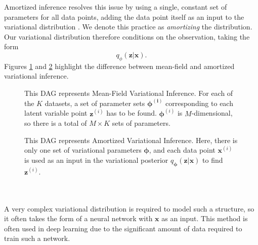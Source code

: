 \documentclass[honours,12pt]{unswthesis}
\numberwithin{equation}{section}
\theoremstyle{definition}
\begin{document}
Amortized inference resolves this issue by using a single, constant set of parameters for all data points, adding the data point itself as an input to the variational distribution \citep{ADVVI}. We denote this practice as \textit{amortizing} the distribution. Our variational distribution therefore conditions on the observation, taking the form
\[q_\phi(\bm{z}|\bm{x}).\]
Figures \ref{fig:3.1} and \ref{fig:3.2} highlight the difference between mean-field and amortized variational inference.\\
\begin{figure}[h]
  \centering
   \caption{\small This DAG represents Mean-Field Variational Inference. For each of the $K$ datasets, a set of parameter sets $\bm{\phi^{(i)}}$ corresponding to each latent variable point $\bm{z}^{(i)}$ has to be found. $\bm{\phi}^{(i)}$ is $M$-dimensional, so there is a total of $M\times K$ sets of parameters.}
   \label{fig:3.1}
\end{figure}
\begin{figure}[h]
\centering
  \caption{\small This DAG represents Amortized Variational Inference. Here, there is only one set of variational parameters $\bm{\phi}$, and each data point $\bm{x}^{(i)}$ is used as an input in the variational posterior $q_{\bm{\phi}}(\bm{z}|\bm{x})$ to find $\bm{z}^{(i)}$.}
  \label{fig:3.2}
\end{figure}\\
\\
A very complex variational distribution is required to model such a structure, so it often takes the form of a neural network with $\bm{x}$ as an input. This method is often used in deep learning due to the significant amount of data required to train such a network.
\end{document}
